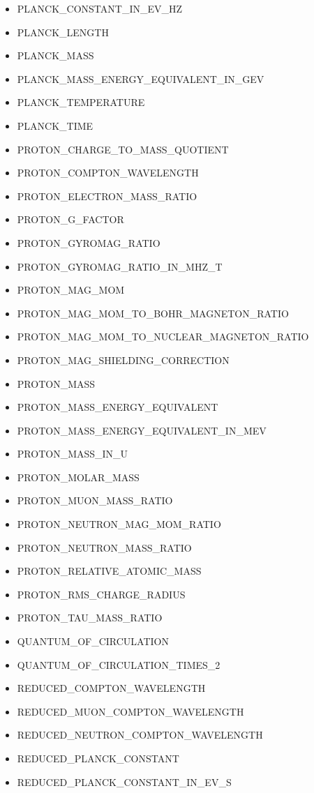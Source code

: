 \begin{itemize}
\item
  PLANCK\_CONSTANT\_IN\_EV\_HZ
\item
  PLANCK\_LENGTH
\item
  PLANCK\_MASS
\item
  PLANCK\_MASS\_ENERGY\_EQUIVALENT\_IN\_GEV
\item
  PLANCK\_TEMPERATURE
\item
  PLANCK\_TIME
\item
  PROTON\_CHARGE\_TO\_MASS\_QUOTIENT
\item
  PROTON\_COMPTON\_WAVELENGTH
\item
  PROTON\_ELECTRON\_MASS\_RATIO
\item
  PROTON\_G\_FACTOR
\item
  PROTON\_GYROMAG\_RATIO
\item
  PROTON\_GYROMAG\_RATIO\_IN\_MHZ\_T
\item
  PROTON\_MAG\_MOM
\item
  PROTON\_MAG\_MOM\_TO\_BOHR\_MAGNETON\_RATIO
\item
  PROTON\_MAG\_MOM\_TO\_NUCLEAR\_MAGNETON\_RATIO
\item
  PROTON\_MAG\_SHIELDING\_CORRECTION
\item
  PROTON\_MASS
\item
  PROTON\_MASS\_ENERGY\_EQUIVALENT
\item
  PROTON\_MASS\_ENERGY\_EQUIVALENT\_IN\_MEV
\item
  PROTON\_MASS\_IN\_U
\item
  PROTON\_MOLAR\_MASS
\item
  PROTON\_MUON\_MASS\_RATIO
\item
  PROTON\_NEUTRON\_MAG\_MOM\_RATIO
\item
  PROTON\_NEUTRON\_MASS\_RATIO
\item
  PROTON\_RELATIVE\_ATOMIC\_MASS
\item
  PROTON\_RMS\_CHARGE\_RADIUS
\item
  PROTON\_TAU\_MASS\_RATIO
\item
  QUANTUM\_OF\_CIRCULATION
\item
  QUANTUM\_OF\_CIRCULATION\_TIMES\_2
\item
  REDUCED\_COMPTON\_WAVELENGTH
\item
  REDUCED\_MUON\_COMPTON\_WAVELENGTH
\item
  REDUCED\_NEUTRON\_COMPTON\_WAVELENGTH
\item
  REDUCED\_PLANCK\_CONSTANT
\item
  REDUCED\_PLANCK\_CONSTANT\_IN\_EV\_S

\end{itemize}
